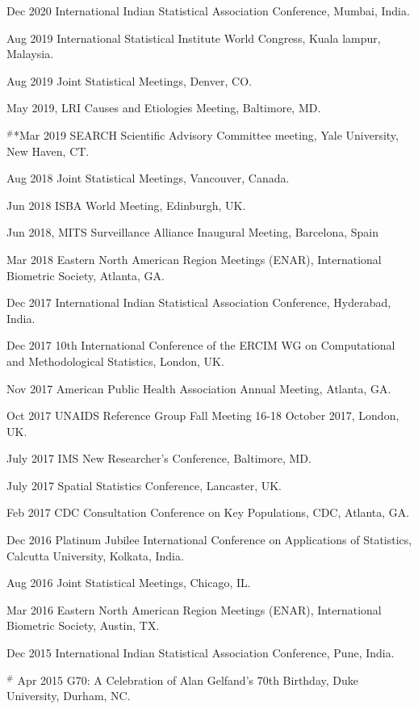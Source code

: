 \documentclass[12pt]{article}
\begin{document}
\item *Dec 2020 International Indian Statistical Association Conference, Mumbai, India.
\item *Aug 2019 International Statistical Institute World Congress, Kuala lampur, Malaysia.
\item *Aug 2019 Joint Statistical Meetings, Denver, CO.
\item *May 2019, LRI Causes and Etiologies Meeting, Baltimore, MD.
\item $^\#$*Mar 2019 SEARCH Scientific Advisory Committee meeting, Yale University, New Haven, CT. 
\item *Aug 2018 Joint Statistical Meetings, Vancouver, Canada.
\item *Jun 2018 ISBA World Meeting, Edinburgh, UK.
\item *Jun 2018, MITS Surveillance Alliance Inaugural Meeting, Barcelona, Spain
\item *Mar 2018 Eastern North American Region Meetings (ENAR), International Biometric
Society, Atlanta, GA.
\item *Dec 2017 International Indian Statistical Association Conference, Hyderabad, India.
\item *Dec 2017 10th International Conference of the ERCIM WG on Computational and
Methodological Statistics, London, UK.
\item *Nov 2017 American Public Health Association Annual Meeting, Atlanta, GA.
\item *Oct 2017 UNAIDS Reference Group Fall Meeting 16-18 October 2017, London, UK.
\item July 2017 IMS New Researcher’s Conference, Baltimore, MD.
\item July 2017 Spatial Statistics Conference, Lancaster, UK.
\item *Feb 2017 CDC Consultation Conference on Key Populations, CDC, Atlanta, GA.
\item *Dec 2016 Platinum Jubilee International Conference on Applications of Statistics, Calcutta
University, Kolkata, India.
\item Aug 2016 Joint Statistical Meetings, Chicago, IL.
\item Mar 2016 Eastern North American Region Meetings (ENAR), International Biometric
Society, Austin, TX.
\item Dec 2015 International Indian Statistical Association Conference, Pune, India.
\item $^\#$ Apr 2015 G70: A Celebration of Alan Gelfand’s 70th Birthday, Duke University, Durham, NC.
\end{document}
